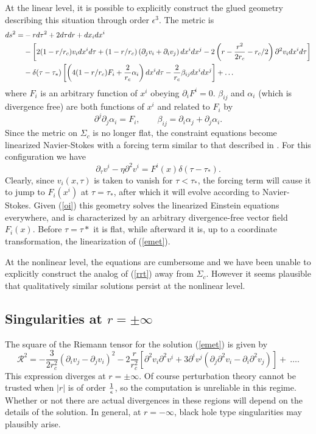 \documentclass{article}
\def\beq{\begin{equation}}
\def\eeq{\end{equation}}
\def\p{\partial}
\def\e{{\epsilon}}
\begin{document}
At the linear level, it is possible to explicitly construct the glued geometry describing this situation through order $\e^3$. The metric is
%
\begin{align}
ds^2 =&-r d\tau^2 + 2 d\tau dr + dx_idx^i \notag\\
&-\left[ 2 (1 - r/r_c)  v_i dx^i d\tau +  (1-r/r_c) \left(\p_jv_i + \p_i v_j \right) dx^i dx^j - 2 \left(r - \frac{r^2}{ 2 r_c} - r_c/2 \right)\p^2 v_i dx^i d\tau \right]\notag\\
&-\delta(\tau-\tau_*)\left[\left( 4 (1 - r/r_c)  F_i  + \frac{2}{r_c } \alpha_{i} \right) dx^i d\tau - \frac{2  }{r_c}  \beta_{ij} dx^i dx^j \right] + \ldots\label{rrt}
\end{align}
%
where $F_i$ is an arbitrary function of $x^i$ obeying $\p_iF^i=0$.  $\beta_{ij}$ and $\alpha_{i}$ (which is divergence free) are both functions of $x^i$ and related to $F_i$ by
%
\beq
\p^j\p_j \alpha_{i}=F_i,\qquad \beta_{ij} = \p_i \alpha_j + \p_j \alpha_i.
\eeq
%
Since the metric on $\Sigma_c$ is no longer flat, the constraint equations become linearized Navier-Stokes with a forcing term similar to that described in \cite{bkls}. For this configuration we have
%
\beq \label{oi}
\p_\tau v^i-\eta\p^2v^i=F^i(x)\delta(\tau-\tau_*).
\eeq
%
Clearly, since $v_i(x, \tau)$ is taken to vanish for $\tau<\tau_*$, the forcing term will cause it to jump to $F_i(x^i)$ at $\tau=\tau_*$, after which it will evolve according to Navier-Stokes.
Given (\ref{oi}) this geometry solves the linearized Einstein equations everywhere, and is characterized by an arbitrary divergence-free vector field $F_i(x)$. Before $\tau=\tau*$ it is flat, while afterward it is, up to a coordinate transformation,  the linearization of (\ref{emet}).

At the nonlinear level, the equations are cumbersome and we have been unable to explicitly construct the analog of (\ref{rrt}) away from $\Sigma_c$.  However it seems plausible that qualitatively similar solutions persist at the nonlinear level.
\subsection{Singularities at $r=\pm\infty$}

The square of the Riemann tensor for the solution  (\ref{emet}) is given by
%
\beq \mathcal{R}^2 =- \frac{3}{2 r_c^2} \left(\p_i v_j - \p_j v_i \right)^2 - 2 \frac{ r}{r_c^2} \left[ \p^2 v_i \p^2 v^i + 3 \p^i v^j \left(\p_j \p^2 v_i - \p_i \p^2 v_j \right) \right] +~\ldots.
\eeq
%
This expression diverges at  $r=\pm \infty$. Of course perturbation theory cannot be trusted
when $|r|$ is of order ${1 \over \e}$, so the computation is unreliable  in this regime.
Whether or not there are actual divergences in these regions will depend on the details of the solution. In general, at $r=-\infty$, black hole type singularities may plausibly arise.
\end{document}
